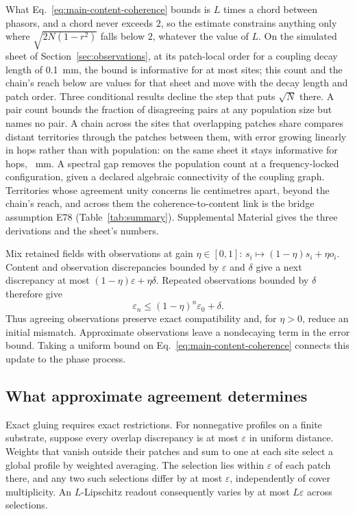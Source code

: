 \documentclass[12pt]{article}
\begin{document}
What Eq.~\eqref{eq:main-content-coherence} bounds is $L$ times a chord between phasors, and a chord never exceeds $2$, so the estimate constrains anything only where $\sqrt{2N(1-r^2)}$ falls below $2$, whatever the value of $L$. On the simulated sheet of Section~\ref{sec:observations}, at its patch-local order for a coupling decay length of 0.1~mm, the bound is informative for at most \wavePatchInformativeSites{} sites; this count and the chain's reach below are values for that sheet and move with the decay length and patch order. Three conditional results decline the step that puts $\sqrt N$ there. A pair count bounds the fraction of disagreeing pairs at any population size but names no pair. A chain across the sites that overlapping patches share compares distant territories through the patches between them, with error growing linearly in hops rather than with population: on the same sheet it stays informative for \waveNerveHops{} hops, \waveNerveReachMm~mm. A spectral gap removes the population count at a frequency-locked configuration, given a declared algebraic connectivity of the coupling graph. Territories whose agreement unity concerns lie centimetres apart, beyond the chain's reach, and across them the coherence-to-content link is the bridge assumption E78 (Table~\ref{tab:summary}). Supplemental Material gives the three derivations and the sheet's numbers.

Mix retained fields with observations at gain $\eta\in[0,1]$:
$s_i\mapsto(1-\eta)s_i+\eta o_i$.
Content and observation discrepancies bounded by $\varepsilon$ and $\delta$ give a next discrepancy at most $(1-\eta)\varepsilon+\eta\delta$. Repeated observations bounded by $\delta$ therefore give
\begin{equation}
 \varepsilon_n\leq(1-\eta)^n\varepsilon_0+\delta.
 \label{eq:main-content-retention}
\end{equation}
Thus agreeing observations preserve exact compatibility and, for $\eta>0$, reduce an initial mismatch. Approximate observations leave a nondecaying term in the error bound. Taking a uniform bound on Eq.~\eqref{eq:main-content-coherence} connects this update to the phase process.

\subsection{What approximate agreement determines}

Exact gluing requires exact restrictions. For nonnegative profiles on a finite substrate, suppose every overlap discrepancy is at most $\varepsilon$ in uniform distance. Weights that vanish outside their patches and sum to one at each site select a global profile by weighted averaging. The selection lies within $\varepsilon$ of each patch there, and any two such selections differ by at most $\varepsilon$, independently of cover multiplicity. An $L$-Lipschitz readout consequently varies by at most $L\varepsilon$ across selections.
\end{document}
